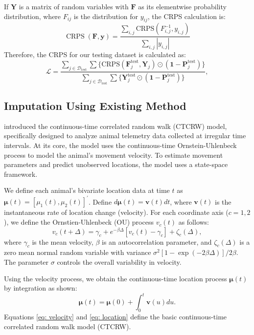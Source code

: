 \documentclass[11pt]{article}
\begin{document}
If $\bm{Y}$ is a matrix of random variables with $\bm{F}$ as its elementwise probability distribution, where $F_{ij}$ is the distribution for $y_{ij}$, the CRPS calculation is: \begin{equation}
    \operatorname{CRPS}\left(\bm{F}, \bm{y}\right) = \frac{\sum_{i,j}\mathrm{CRPS}(F^{-1}_{i,j},y_{i,j})}{\sum_{i,j}|y_{i,j}|}
\end{equation}
Therefore, the CRPS for our testing dataset is calculated as: \begin{equation}
    \mathcal{L}=\frac{\sum_{j\in \mathcal{D}_{\mathrm{test}}}\sum \big\{\mathrm{CRPS}(\bm{F}^{\mathrm{test}}_j,\bm{Y}_j)\odot (\bm{1}-\bm{P}_j^{\mathrm{test}})\big\}}{\sum_{j\in \mathcal{D}_{\mathrm{test}}}\sum\{\bm{Y}_j^{\mathrm{test}}\odot (\bm{1}-\bm{P}_j^{\mathrm{test}})\}},
\end{equation}



\subsection{Imputation Using Existing Method}\label{sec: imputation using ctcrw}

\citet{johnson2008continuous} introduced the continuous-time correlated random walk (CTCRW) model, specifically designed to analyze animal telemetry data collected at irregular time intervals. At its core, the model uses the continuous-time Ornstein-Uhlenbeck process to model the animal's movement velocity. To estimate movement parameters and predict unobserved locations, the model uses a state-space framework. 

We define each animal's bivariate location data at time $t$ as $\bm{\mu}(t)=[\mu_1(t), \mu_2(t)]^{\prime}$. Define $d\bm{\mu}(t)=\bm{v}(t)dt$, where $\bm{v}(t)$ is the instantaneous rate of location change (velocity). For each coordinate axis ($c=1, 2$), we define the Ornstien-Uhlenbeck (OU) process $v_c(t)$ as follows:
\begin{equation}\label{eq: velocity}
    v_c(t+\Delta)=\gamma_c+e^{-\beta\Delta}[v_c(t)-\gamma_c]+\zeta_c(\Delta),
\end{equation}
where $\gamma_c$ is the mean velocity, $\beta$ is an autocorrelation parameter, and $\zeta_c(\Delta)$ is a zero mean normal random variable with variance $\sigma^2[1-\exp(-2\beta\Delta)]/2\beta$. The parameter $\sigma$ controls the overall variability in velocity.

Using the velocity process, we obtain the continuous-time location process $\bm{\mu}(t)$ by integration as shown:
\begin{equation}\label{eq: location}
    \bm{\mu}(t)=\bm{\mu}(0)+\int_{0}^{t}\bm{v}(u)du.
\end{equation}
Equations \ref{eq: velocity} and \ref{eq: location} define the basic continuous-time correlated random walk model (CTCRW).
\end{document}
